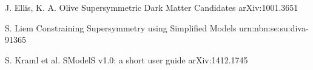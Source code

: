 \begin{thebibliography}{2}
   
             {J. Ellis, K. A. Olive}
             {Supersymmetric Dark Matter Candidates}
             {arXiv:1001.3651}

             {S. Liem}
             {Constraining Supersymmetry using Simplified Models}
             {urn:nbn:se:su:diva-91365}

             {S. Kraml et al.}
             {SModelS v1.0: a short user guide}
             {arXiv:1412.1745}

%
%

\end{thebibliography}



